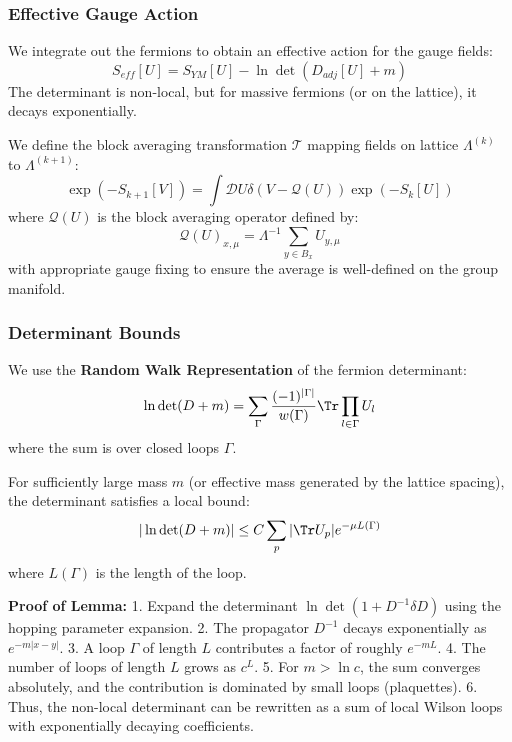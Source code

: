 \subsubsection{Effective Gauge Action}

We integrate out the fermions to obtain an effective action for the gauge fields:
\begin{equation}
S_{eff}[U] = S_{YM}[U] - \ln \det(D_{adj}[U] + m)
\end{equation}
The determinant is non-local, but for massive fermions (or on the lattice), it decays exponentially.

\begin{definition}
We define the block averaging transformation $\mathcal{T}$ mapping fields on lattice $\Lambda^{(k)}$ to $\Lambda^{(k+1)}$:
\begin{equation}
\exp(-S_{k+1}[V]) = \int \mathcal{D}U \delta(V - \mathcal{Q}(U)) \exp(-S_k[U])
\end{equation}
where $\mathcal{Q}(U)$ is the block averaging operator defined by:
\begin{equation}
\mathcal{Q}(U)_{x, \mu} = \Lambda^{-1} \sum_{y \in B_x} U_{y, \mu}
\end{equation}
with appropriate gauge fixing to ensure the average is well-defined on the group manifold.
\end{definition}

\subsubsection{Determinant Bounds}

We use the \textbf{Random Walk Representation} of the fermion determinant:
\begin{equation}
\ln \det(D+m) = \sum_{\Gamma} \frac{(-1)^{|\Gamma|}}{w(\Gamma)} \Tr \prod_{l \in \Gamma} U_l
\end{equation}
where the sum is over closed loops $\Gamma$.

\begin{lemma}
For sufficiently large mass $m$ (or effective mass generated by the lattice spacing), the determinant satisfies a local bound:
\begin{equation}
|\ln \det(D+m)| \le C \sum_p |\Tr U_p| e^{-\mu L(\Gamma)}
\end{equation}
where $L(\Gamma)$ is the length of the loop.
\end{lemma}

\textbf{Proof of Lemma:}
1.  Expand the determinant $\ln \det (1 + D^{-1} \delta D)$ using the hopping parameter expansion.
2.  The propagator $D^{-1}$ decays exponentially as $e^{-m |x-y|}$.
3.  A loop $\Gamma$ of length $L$ contributes a factor of roughly $e^{-m L}$.
4.  The number of loops of length $L$ grows as $c^L$.
5.  For $m > \ln c$, the sum converges absolutely, and the contribution is dominated by small loops (plaquettes).
6.  Thus, the non-local determinant can be rewritten as a sum of local Wilson loops with exponentially decaying coefficients.

